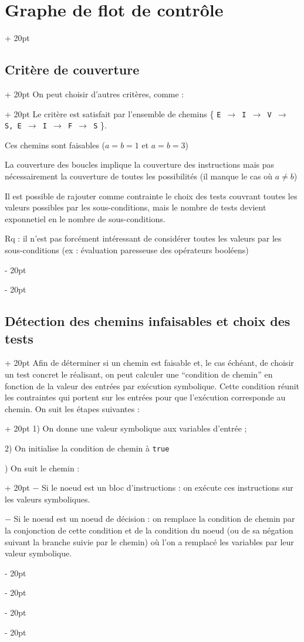 \documentclass[a4paper, 12pt, twoside]{article}
\newcommand{\ind}[1][20pt]{\advance\leftskip + #1}
\newcommand{\deind}[1][20pt]{\advance\leftskip - #1}
\newenvironment{indentedenv}[1][20pt]{\par \ind[#1]}{\par \deind}
\newenvironment{indt}[2][20pt]{#2 \begin{indentedenv}[#1]}{\end{indentedenv}} %
\begin{document}
\begin{indt}{\section{Graphe de flot de contrôle}}
\begin{indt}{\subsection{Critère de couverture}}
\begin{indt}{On peut choisir d'autres critères, comme :}
                Le critère est satisfait par l'ensemble de chemins \{ \texttt{E $\rightarrow$ I $\rightarrow$ V $\rightarrow$ S, E $\rightarrow$ I $\rightarrow$ F $\rightarrow$ S} \}.
                
                Ces chemins sont faisables ($a = b = 1$ et $a = b = 3$)
                
                La couverture des boucles implique la couverture des instructions mais pas nécessairement la couverture de toutes les possibilités (il manque le cas où $a \neq b$)
                
                Il est possible de rajouter comme contrainte le choix des tests couvrant toutes les valeurs possibles par les sous-conditions, mais le nombre de tests devient exponnetiel en le nombre de sous-conditions.
                
                Rq : il n'est pas forcément intéressant de considérer toutes les valeurs par les sous-conditions (ex : évaluation paresseuse des opérateurs booléens)
            \end{indt}
        \end{indt}
        
        \vspace{12pt}
        
        \begin{indt}{\subsection{Détection des chemins infaisables et choix des tests}}
            \begin{indt}{Afin de déterminer si un chemin est faisable et, le cas échéant, de choisir un test concret le réalisant, on peut calculer une ``condition de chemin'' en fonction de la valeur des entrées par exécution symbolique. Cette condition réunit les contraintes qui portent sur les entrées pour que l'exécution corresponde au chemin. On suit les étapes suivantes :}
                1) On donne une valeur symbolique aux variables d'entrée ;
                
                2) On initialise la condition de chemin à \texttt{true}
                
                \begin{indt}{3) On suit le chemin :}
                    $-$ Si le noeud est un bloc d'instructions : on exécute ces instructions sur les valeurs symboliques.
                    
                    $-$ Si le noeud est un noeud de décision : on remplace la condition de chemin par la conjonction de cette condition et de la condition du noeud (ou de sa négation suivant la branche suivie par le chemin) où l'on a remplacé les variables par leur valeur symbolique.
                \end{indt}
            \end{indt}
            

\end{indt}
\end{indt}
\end{document}

